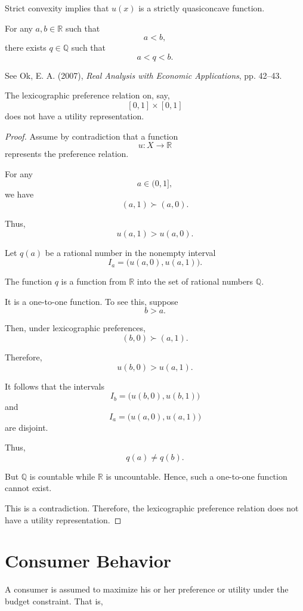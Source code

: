 Strict convexity implies that \(u(x)\) is a strictly quasiconcave function.

\begin{remark}
For any \(a,b \in \mathbb{R}\) such that
\[
a < b,
\]
there exists \(q \in \mathbb{Q}\) such that
\[
a < q < b.
\]

See Ok, E. A. (2007), \textit{Real Analysis with Economic Applications}, pp. 42--43.
\end{remark}

\begin{proposition}
The lexicographic preference relation on, say,
\[
[0,1] \times [0,1]
\]
does not have a utility representation.
\end{proposition}

\begin{proof}
Assume by contradiction that a function
\[
u : X \to \mathbb{R}
\]
represents the preference relation.

For any
\[
a \in (0,1],
\]
we have
\[
(a,1) \succ (a,0).
\]

Thus,
\[
u(a,1) > u(a,0).
\]

Let \(q(a)\) be a rational number in the nonempty interval
\[
I_a = \bigl(u(a,0),u(a,1)\bigr).
\]

The function \(q\) is a function from \(\mathbb{R}\) into the set of rational numbers \(\mathbb{Q}\).

It is a one-to-one function. To see this, suppose
\[
b > a.
\]

Then, under lexicographic preferences,
\[
(b,0) \succ (a,1).
\]

Therefore,
\[
u(b,0) > u(a,1).
\]

It follows that the intervals
\[
I_b = \bigl(u(b,0),u(b,1)\bigr)
\]
and
\[
I_a = \bigl(u(a,0),u(a,1)\bigr)
\]
are disjoint.

Thus,
\[
q(a) \ne q(b).
\]

But \(\mathbb{Q}\) is countable while \(\mathbb{R}\) is uncountable. Hence, such a one-to-one function cannot exist.

This is a contradiction. Therefore, the lexicographic preference relation does not have a utility representation.
\end{proof}



\section{Consumer Behavior}

A consumer is assumed to maximize his or her preference or utility under the budget constraint. That is,

